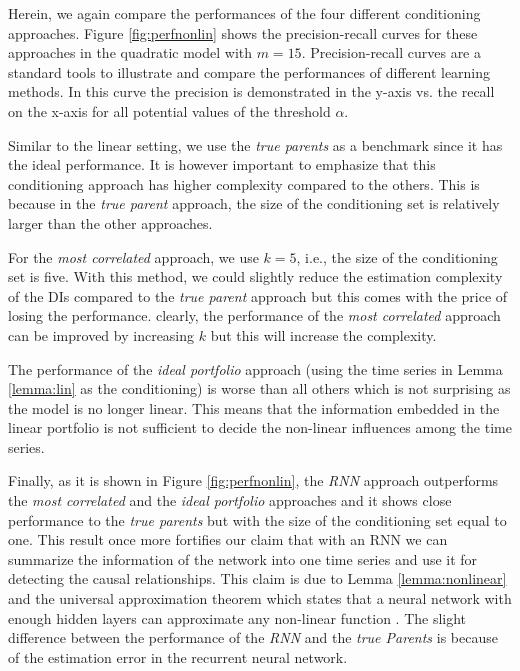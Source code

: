 Herein, we again compare the performances of the four different conditioning approaches. 
Figure \ref{fig:perfnonlin} shows the precision-recall curves for these approaches in the quadratic model with $m=15$. 
Precision-recall curves are a standard tools to illustrate and compare the performances of different learning methods. 
In this curve the precision is demonstrated in the y-axis vs. the recall on the x-axis for all potential values of the threshold $\alpha$. 

Similar to the linear setting, we use the \textit{true parents} as a benchmark since it has the ideal performance. 
It is however important to emphasize that this conditioning approach has higher complexity compared to the others. 
This is because in the \textit{true parent} approach, the size of the conditioning set is relatively larger than the other approaches. 


For the \textit{most correlated} approach, we use $k=5$, i.e., the size of the conditioning set is five.
With this method, we could slightly reduce the estimation complexity of the DIs compared to the  \textit{true parent} approach but this comes with the price of losing the performance.
clearly, the performance of the \textit{most correlated} approach can be improved by increasing $k$ but this will increase the complexity.


The performance of the \textit{ideal portfolio} approach (using the time series in Lemma \ref{lemma:lin} as the conditioning) is worse than all others which is not surprising as the model is no longer linear. 
This means that the information embedded in the linear portfolio is not sufficient to decide the non-linear influences among the time series. 


Finally, as it is shown in Figure \ref{fig:perfnonlin}, the \textit{RNN} approach outperforms the \textit{most correlated} and the \textit{ideal portfolio} approaches and it shows close performance to the \textit{true parents} but with the size of the conditioning set equal to one. 
This result once more fortifies our claim that with an RNN we can summarize the information of the network into one time series and use it for detecting the causal relationships. 
This claim is due to Lemma \ref{lemma:nonlinear} and the universal approximation theorem which states that a neural network with enough hidden layers can approximate any non-linear function  \citet{HORNIK1989359}.
The slight difference between the performance of the \textit{RNN} and the \textit{true Parents} is because of the estimation error in the recurrent neural network. 

